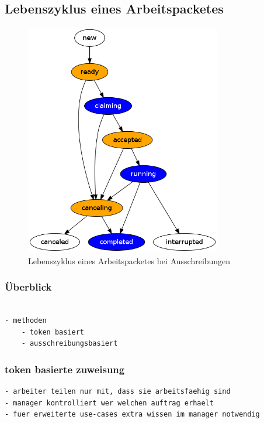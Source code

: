 \subsection{Lebenszyklus eines Arbeitspacketes}


\begin{figure}[ht] 
  \label{fig:lebenszyklus-arbeitspaket}
  \begin{center}
      \includegraphics[height=4in]{imageinput/lebenszyklus-arbeitspaket.png}
  \end{center}
  \caption{Lebenszyklus eines Arbeitspacketes bei Ausschreibungen}
\end{figure}



\subsubsection{\"Uberblick}

\begin{verbatim}

- methoden
    - token basiert
    - ausschreibungsbasiert

\end{verbatim}


\subsubsection{token basierte zuweisung}

\begin{verbatim}
- arbeiter teilen nur mit, dass sie arbeitsfaehig sind
- manager kontrolliert wer welchen auftrag erhaelt
- fuer erweiterte use-cases extra wissen im manager notwendig
\end{verbatim}

